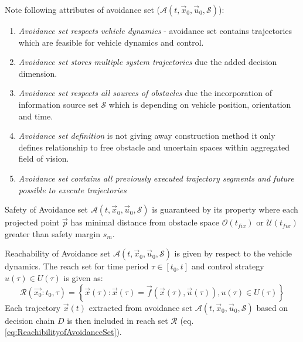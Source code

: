     \begin{note} Note following attributes of avoidance set ($\mathscr{A}(t,\vec{x}_0,\vec{u}_0,\mathscr{S})$):
    \begin{enumerate}
        \item \emph{Avoidance set respects vehicle dynamics} - avoidance set contains trajectories which are feasible for vehicle dynamics and control.
        \item \emph{Avoidance set stores multiple system trajectories} due the added decision dimension.
        \item \emph{Avoidance set respects all sources of obstacles} due the incorporation of information source set $\mathscr{S}$ which is depending on vehicle position, orientation and time.
        \item \emph{Avoidance set definition} is not giving away construction method it only defines relationship to free obstacle and uncertain spaces within aggregated field of vision.
        \item \emph{Avoidance set contains all previously executed trajectory segments and future possible to execute trajectories}
    \end{enumerate}
    \end{note}
    
    \begin{definition}{Safety of Avoidance set $\mathscr{A}(t,\vec{x}_0,\vec{u}_0,\mathscr{S})$} is guaranteed by its property where each projected point $\vec{p}$ has minimal distance from obstacle space $\mathscr{O}(t_{fix})$ or $\mathscr{U}(t_{fix})$ greater than safety margin $s_m$.
    \end{definition}
    
    \begin{definition}{Reachability of Avoidance set $\mathscr{A}(t,\vec{x}_0,\vec{u}_0,\mathscr{S})$} is given by respect to the vehicle dynamics. The reach set for time period $\tau\in[t_0,t]$ and control strategy $u(\tau)\in U(\tau)$ is given as:
    \begin{equation}\label{eq:ReachibilityofAvoidanceSet}
        \mathscr{R}(\vec{x_0}:t_0,\tau)=\left\{\vec{x}(\tau):\vec{x}(\tau)=\vec{f}(\vec{x}(\tau),\vec{u}(\tau)),u(\tau)\in U(\tau)\right\}
    \end{equation}
    Each trajectory $\vec{x}(t)$ extracted from avoidance set $\mathscr{A}(t,\vec{x}_0,\vec{u}_0,\mathscr{S})$ based on decision chain $D$ is then included in reach set $\mathscr{R}$ (eq. \ref{eq:ReachibilityofAvoidanceSet}).
    \end{definition}
    
